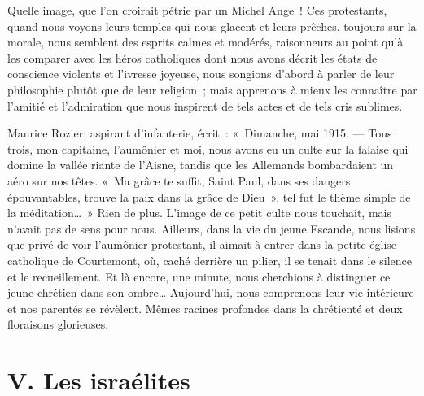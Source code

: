 \documentclass[french,twoside]{book} %
\newcommand\chapteropen{} %
\newcommand\chapterclose{} %
\begin{document}
\noindent Quelle image, que l’on croirait pétrie par un Michel Ange ! Ces protestants, quand nous voyons leurs temples qui nous glacent et leurs prêches, toujours sur la morale, nous semblent des esprits calmes et modérés, raisonneurs au point qu’à les comparer avec les héros catholiques dont nous avons décrit les états de conscience violents et l’ivresse joyeuse, nous songions d’abord à parler de leur philosophie plutôt que de leur religion ; mais apprenons à mieux les connaître par l’amitié et l’admiration que nous inspirent de tels actes et de tels cris sublimes.‌\par
Maurice Rozier, aspirant d’infanterie, écrit : « Dimanche, mai 1915. — Tous trois, mon capitaine, l’aumônier et moi, nous avons eu un culte sur la falaise qui domine la vallée riante de l’Aisne, tandis que les Allemands bombardaient un aéro sur nos têtes. « Ma grâce te suffit, Saint Paul, dans ses dangers épouvantables, trouve la paix dans la grâce de Dieu », tel fut le thème simple de la méditation… » Rien de plus. L’image de ce petit culte nous touchait, mais n’avait pas de sens pour nous. Ailleurs, dans la vie du jeune Escande, nous lisions que privé de voir l’aumônier protestant, il aimait à entrer dans la petite église catholique de Courtemont, où, caché derrière un pilier, il se tenait dans le silence et le recueillement. Et là encore, une minute, nous cherchions à distinguer ce jeune chrétien dans son ombre… Aujourd’hui, nous comprenons leur vie intérieure et nos parentés se révèlent. Mêmes racines profondes dans la chrétienté et deux floraisons glorieuses.‌
\chapterclose


\chapteropen
\chapter[{V. Les israélites}]{V. Les israélites}\renewcommand{\leftmark}{V. Les israélites}
\end{document}
